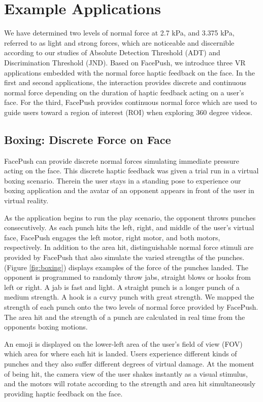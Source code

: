 \chapter{Example Applications} \label{chapter:interaction_techniques}
We have determined two levels of normal force at 2.7 kPa, and 3.375 kPa, referred to as light and strong forces, which are noticeable and discernible according to our studies of Absolute Detection Threshold (ADT) and Discrimination Threshold (JND). Based on FacePush, we introduce three VR applications embedded with the normal force haptic feedback on the face. In the first and second applications, the interaction provides discrete and continuous normal force depending on the duration of haptic feedback acting on a user's face. For the third, FacePush provides continuous normal force which are used to guide users toward a region of interest (ROI) when exploring 360 degree videos. 

\section{Boxing: Discrete Force on Face }

FacePush can provide discrete normal forces simulating immediate pressure acting on the face. This discrete haptic feedback was given a trial run in a virtual boxing scenario. Therein the user stays in a standing pose to experience our boxing application and the avatar of an opponent appears in front of the user in virtual reality.

As the application begins to run the play scenario, the opponent throws punches consecutively. As each punch hits the left, right, and middle of the user's virtual face, FacePush engages the left motor, right motor, and both motors, respectively. In addition to the area hit, distinguishable normal force stimuli are provided by FacePush that also simulate the varied strengths of the punches. (Figure \ref{fig:boxing}) displays examples of the force of the punches landed. The opponent is programmed to randomly throw jabs, straight blows or hooks from left or right. A jab is fast and light. A straight punch is a longer punch of a medium strength. A hook is a curvy punch with great strength. We mapped the strength of each punch onto the two levels of normal force provided by FacePush. The area hit and the strength of a punch are calculated in real time from the opponents boxing motions. 

An emoji is displayed on the lower-left area of the user's field of view (FOV) which area for where each hit is landed. Users experience different kinds of punches and they also suffer different degrees of virtual damage. At the moment of being hit, the camera view of the user shakes instantly as a visual stimulus, and the motors will rotate according to the strength and area hit simultaneously providing haptic feedback on the face.

